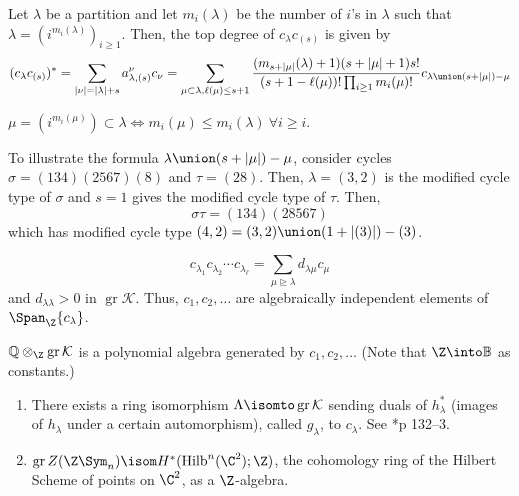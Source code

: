 \documentclass[11pt,leqno,oneside]{amsbook}
\newcommand{\dominates}{\trianglerighteq}
\newcommand{\B}{\mathbb{B}}
\newcommand{\K}{\mathcal{K}} %
\DeclareMathOperator{\gr}{gr}
\DeclareMathOperator{\Hilb}{Hilb}
\numberwithin{thm}{section}
\begin{document}
\begin{prop}
  Let \(\lambda\) be a partition and let \(m_i(\lambda)\) be the
  number of \(i\)'s in \(\lambda\) such 
  that \(\lambda = (i^{m_i(\lambda)})_{i \geq 1}\). Then, the top
  degree of \(c_\lambda c_{(s)}\) is given by \[
    (c_\lambda c_{(s)})^* = \sum_{|\nu|=|\lambda|+s}
    a^\nu_{\lambda,(s)} c_\nu = \sum_{\mu \subset \lambda, \ell(\mu) \leq
      s+1} \frac{(m_{s+|\mu|}(\lambda)+1)(s+|\mu|+1)s!}{(s+1-\ell(\mu))!
    \prod_{i \geq 1} m_i(\mu)!} c_{\lambda \union(s+|\mu|) - \mu}
  \]
\end{prop}
\begin{rmk}
  \(\mu = (i^{m_i(\mu)}) \subset \lambda \iff m_i(\mu) \leq
  m_i(\lambda) \ \forall i \geq i\).
\end{rmk}
\begin{example}
  To illustrate the formula \(\lambda \union (s+|\mu|)-\mu\), consider
  cycles \(\sigma = (134)(2567)(8)\) and \(\tau = 
  (28)\). Then, \(\lambda = (3,2)\) is the modified cycle type of
  \(\sigma\) and \(s=1\) gives the modified cycle type of
  \(\tau\). Then, \[
    \sigma \tau = (134)(28567)
  \]
  which has modified cycle type \((4,2) = (3,2) \union (1+|(3)|) -
  (3)\).
\end{example}
\begin{cor}
  \[
    c_{\lambda_1} c_{\lambda_2} \cdots c_{\lambda_\ell} = \sum_{\mu
      \dominates \lambda} d_{\lambda \mu} c_\mu
  \]
  and \(d_{\lambda \lambda} > 0\) in \(\gr \K\). Thus, \(c_{1}, c_2,
  \ldots\) are algebraically independent elements of
  \(\Span_\Z\{c_\lambda\}\).
\end{cor}
\begin{prop}
  \(\mathbb{Q} \otimes_\Z \gr \K\) is a polynomial algebra generated
  by \(c_1, c_2, \ldots\) (Note that \(\Z \into \B\) as constants.)
\end{prop}
\begin{rmk}
  \begin{enumerate}
  \item There exists a ring isomorphism \(\Lambda \isomto
    \gr\K\) sending duals of \(h_\lambda^*\) (images of \(h_\lambda\)
    under a certain automorphism), called \(g_\lambda\), to
    \(c_\lambda\). See  
    \cite{macdonald}*{p 132--3}.
  \item \(\gr Z(\Z \Sym_n) \isom H^*(\Hilb^n(\C^2);\Z)\), the
    cohomology ring of the Hilbert Scheme of points on \(\C^2\), as a
    \(\Z\)-algebra.
  \end{enumerate}
\end{rmk}
\end{document}
